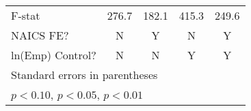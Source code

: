 \begin{table}[htbp]
\begin{tabular}{l*{4}{c}}
F-stat              &       276.7         &       182.1         &       415.3         &       249.6         \\
NAICS FE?           &           N         &           Y         &           N         &           Y         \\
ln(Emp) Control?    &           N         &           N         &           Y         &           Y         \\
\bottomrule
\multicolumn{5}{l}{\footnotesize Standard errors in parentheses}\\
\multicolumn{5}{l}{\footnotesize \sym{*} \(p<0.10\), \sym{**} \(p<0.05\), \sym{***} \(p<0.01\)}\\
\end{tabular}
\end{table}
